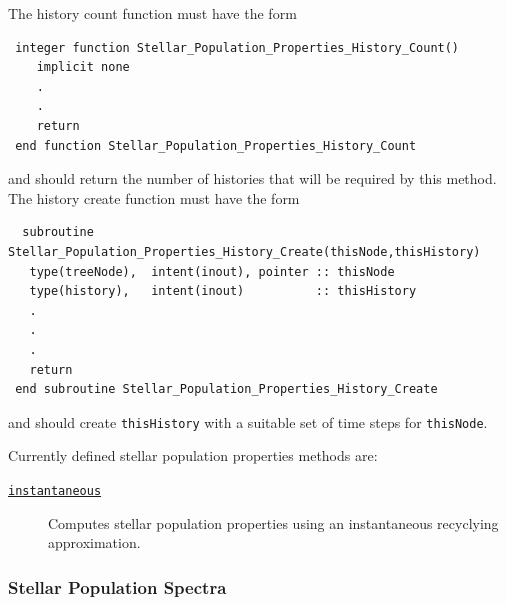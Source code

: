 The history count function must have the form
\begin{verbatim}
 integer function Stellar_Population_Properties_History_Count()
    implicit none
    .
    .
    return
 end function Stellar_Population_Properties_History_Count
\end{verbatim}
and should return the number of histories that will be required by this method. The history create function must have the form
\begin{verbatim}
  subroutine Stellar_Population_Properties_History_Create(thisNode,thisHistory)
   type(treeNode),  intent(inout), pointer :: thisNode
   type(history),   intent(inout)          :: thisHistory
   .
   .
   .
   return
 end subroutine Stellar_Population_Properties_History_Create
\end{verbatim}
and should create {\tt thisHistory} with a suitable set of time steps for {\tt thisNode}.

Currently defined stellar population properties methods are:
\begin{description}
 \item [\hyperlink{stellar_populations.properties.instantaneous.F90:stellar_population_properties_instantaneous:stellar_population_properties_rates_instantaneous}{{\tt instantaneous}}] Computes stellar population properties using an instantaneous recyclying approximation.
\end{description}

\subsubsection{Stellar Population Spectra}\label{sec:StellarPopulationSpectra}

